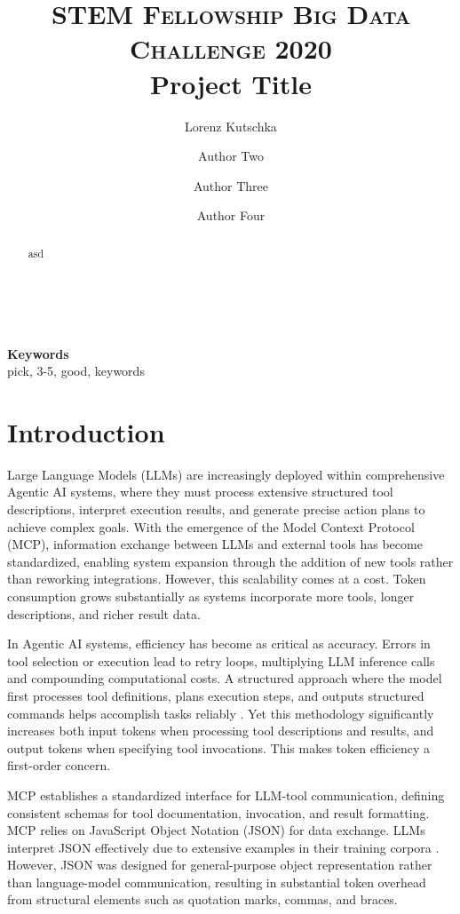 \documentclass[10pt,twocolumn,letterpaper]{article}
\title{
		\usefont{OT1}{bch}{b}{n}
		\normalfont \normalsize \textsc{STEM Fellowship Big Data Challenge 2020} \\ [10pt]
		\huge Project Title \\
}
\author[1]{Lorenz Kutschka}
\author[1]{Author Two}
\author[1]{Author Three}
\author[2]{Author Four}
\affil[1]{High School 1}
\affil[2]{High School 2}
\begin{document}
\maketitle

\begin{abstract}
asd
\end{abstract} \\ 
\\ 
{\textbf{Keywords} \\
pick, 3-5, good, keywords}

\section{Introduction}
\label{sec:introduction}
Large Language Models (LLMs) are increasingly deployed within comprehensive Agentic AI systems, where they must process extensive structured tool descriptions, interpret execution results, and generate precise action plans to achieve complex goals. With the emergence of the Model Context Protocol (MCP), information exchange between LLMs and external tools has become standardized, enabling system expansion through the addition of new tools rather than reworking integrations. However, this scalability comes at a cost. Token consumption grows substantially as systems incorporate more tools, longer descriptions, and richer result data.

In Agentic AI systems, efficiency has become as critical as accuracy. Errors in tool selection or execution lead to retry loops, multiplying LLM inference calls and compounding computational costs. A structured approach where the model first processes tool definitions, plans execution steps, and outputs structured commands helps accomplish tasks reliably \citep{Ro_Qiu_Goiri_Fonseca_Bianchini_Akella_Wang_Erez_Choukse_2025}. Yet this methodology significantly increases both input tokens when processing tool descriptions and results, and output tokens when specifying tool invocations. This makes token efficiency a first-order concern.

MCP establishes a standardized interface for LLM-tool communication, defining consistent schemas for tool documentation, invocation, and result formatting. MCP relies on JavaScript Object Notation (JSON) for data exchange. LLMs interpret JSON effectively due to extensive examples in their training corpora \citep{Bourhis_Reutter_Suárez_Vrgoč_2017}. However, JSON was designed for general-purpose object representation rather than language-model communication, resulting in substantial token overhead from structural elements such as quotation marks, commas, and braces.
\end{document}
